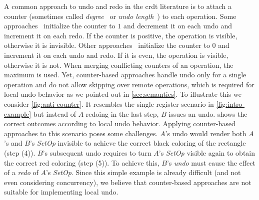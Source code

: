 \documentclass[sigplan,natbib=false,review]{acmart}
\newcommand{\setopkind}{\textit{SetOp}}
\begin{document}
A common approach to undo and redo in the \gls{crdt} literature is
to attach a counter
(sometimes called \emph{degree}~\cite{Weiss2010LogootUndo} or
\emph{undo length}~\cite{Brattli2021undo,Yu2019undo}) to each operation.
Some approaches~\cite{Weiss2010LogootUndo,Martin2010xml} initialize the
counter to $1$ and decrement it on each undo and increment it on each redo.
If the counter is positive, the operation is visible,
otherwise it is invisible.
Other approaches~\cite{Brattli2021undo,Yu2019undo} initialize the counter
to $0$ and increment it on each undo and redo.
If it is even, the operation is visible, otherwise it is not.
When merging conflicting counters of an operation, the maximum is used.
Yet, counter-based approaches handle undo only for a single operation
and do not allow skipping over remote operations, which is required
for local undo behavior as we pointed out in \cref{sec:semantics}.
To illustrate this we consider \cref{fig:anti-counter}.
It resembles the single-register scenario in \cref{fig:intro-example} but
instead of $A$ redoing in the last step, $B$ issues an undo.
 shows the correct outcomes according to local undo
behavior.
Applying counter-based approaches to this scenario poses some challenges.
$A$'s undo would render both $A$'s and $B$'s \setopkind{} invisible to
achieve the correct black coloring of the rectangle (step (4)).
$B$'s subsequent undo requires to turn $A$'s \setopkind{} visible again to
obtain the correct red coloring (step (5)).
To achieve this, $B$'s \emph{undo} must cause the effect of a \emph{redo}
of $A$'s \setopkind{}.
Since this simple example is already difficult (and not even considering
concurrency), we believe that counter-based approaches are not suitable
for implementing local undo.

\end{document}

